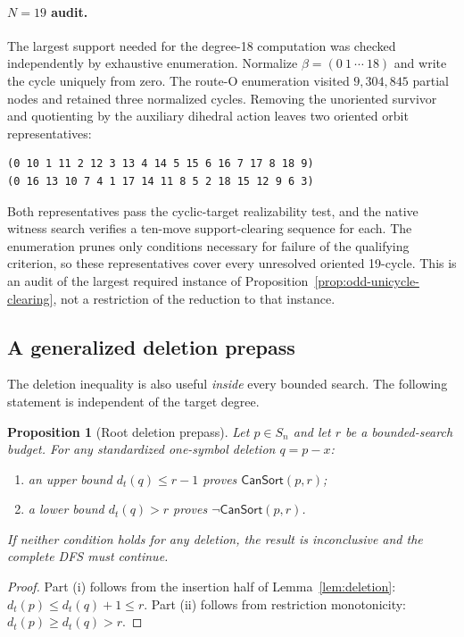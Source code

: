 \documentclass[11pt]{article}
\newtheorem{proposition}[theorem]{Proposition}
\theoremstyle{definition}
\theoremstyle{remark}
\newcommand{\dist}{d_t}
\newcommand{\CanSort}{\mathsf{CanSort}}
\begin{document}
\paragraph{$N=19$ audit.}
The largest support needed for the degree-18 computation was checked
independently by exhaustive enumeration.  Normalize
$\beta=(0\ 1\ \cdots\ 18)$ and write the cycle uniquely from zero.  The
route-O enumeration visited $9{,}304{,}845$ partial nodes and retained three
normalized cycles.  Removing the unoriented survivor and quotienting by the
auxiliary dihedral action leaves two oriented orbit representatives:
\begin{verbatim}
(0 10 1 11 2 12 3 13 4 14 5 15 6 16 7 17 8 18 9)
(0 16 13 10 7 4 1 17 14 11 8 5 2 18 15 12 9 6 3)
\end{verbatim}
Both representatives pass the cyclic-target realizability test, and the native
witness search verifies a ten-move support-clearing sequence for each.  The
enumeration prunes only conditions necessary for failure of the qualifying
criterion, so these representatives cover every unresolved oriented
19-cycle.  This is an audit of the largest required instance of
Proposition~\ref{prop:odd-unicycle-clearing}, not a restriction of the
reduction to that instance.

\subsection{A generalized deletion prepass}

The deletion inequality is also useful \emph{inside} every bounded search.
The following statement is independent of the target degree.

\begin{proposition}[Root deletion prepass]
\label{prop:root-prepass}
Let $p\in S_n$ and let $r$ be a bounded-search budget.  For any standardized
one-symbol deletion $q=p-x$:
\begin{enumerate}[label=(\roman*)]
  \item an upper bound $\dist(q)\leq r-1$ proves
    $\CanSort(p,r)$;
  \item a lower bound $\dist(q)>r$ proves
    $\neg\CanSort(p,r)$.
\end{enumerate}
If neither condition holds for any deletion, the result is inconclusive and
the complete DFS must continue.
\end{proposition}

\begin{proof}
Part (i) follows from the insertion half of
Lemma~\ref{lem:deletion}:
$\dist(p)\leq\dist(q)+1\leq r$.  Part (ii) follows from restriction
monotonicity: $\dist(p)\geq\dist(q)>r$.
\end{proof}
\end{document}
